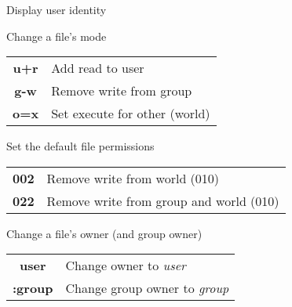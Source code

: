 \documentclass[12pt, a4paper]
{article}
\begin{document}
\begin{multicols}{3}
		\begin{description}[nolistsep]
			\item[id] Display user identity
			\item[chmod] Change a file's mode
			\item
			\begin{tabular}{cl}
				{\large \ttfamily \textbf{u+r}} & Add read to user \\
				{\large \ttfamily \textbf{g-w}} & Remove write from group \\
				{\large \ttfamily \textbf{o=x}} & Set execute for other (world) \\
			\end{tabular}
			\item[umask] Set the default file permissions
			\item
			\begin{tabular}{cl}
				{\large \ttfamily \textbf{002}} & Remove write from world (010) \\
				{\large \ttfamily \textbf{022}} & Remove write from group and world (010) \\
			\end{tabular}
			\item[chown] Change a file's owner (and group owner)
			\item
			\begin{tabular}{cl}
				{\large \ttfamily \textbf{user}} & Change owner to \textit{user} \\
				{\large \ttfamily \textbf{:group}} & Change group owner to \textit{group} \\
			\end{tabular}
		\end{description}
		
		
		

\end{multicols}
\end{document}
